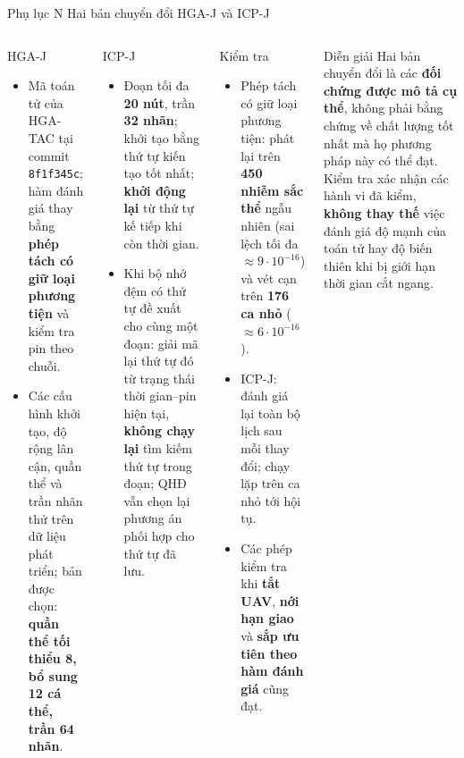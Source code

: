 \documentclass[aspectratio=169,10pt,t,xcolor={table}]{beamer}
\newcommand{\apptitle}[2]{Phụ lục #1 \textperiodcentered{} #2}
\begin{document}
\begin{frame}{\apptitle{N}{Hai bản chuyển đổi HGA-J và ICP-J}}
\begin{columns}[T,onlytextwidth]
\begin{block}{HGA-J}
\scriptsize
\begin{itemize}
\item Mã toán tử của HGA-TAC tại commit \texttt{8f1f345c}; hàm đánh giá thay bằng \textbf{phép tách có giữ loại phương tiện} và kiểm tra pin theo chuỗi.
\item Các cấu hình khởi tạo, độ rộng lân cận, quần thể và trần nhãn thử trên dữ liệu phát triển; bản được chọn: \textbf{quần thể tối thiểu 8, bổ sung 12 cá thể, trần 64 nhãn}.
\end{itemize}
\end{block}
\begin{block}{ICP-J}
\scriptsize
\begin{itemize}
\item Đoạn tối đa \textbf{20 nút}, trần \textbf{32 nhãn}; khởi tạo bằng thứ tự kiến tạo tốt nhất; \textbf{khởi động lại} từ thứ tự kế tiếp khi còn thời gian.
\item Khi bộ nhớ đệm có thứ tự đề xuất cho cùng một đoạn: giải mã lại thứ tự đó từ trạng thái thời gian--pin hiện tại, \textbf{không chạy lại} tìm kiếm thứ tự trong đoạn; QHĐ vẫn chọn lại phương án phối hợp cho thứ tự đã lưu.
\end{itemize}
\end{block}
\begin{block}{Kiểm tra}
\scriptsize
\begin{itemize}
\item Phép tách có giữ loại phương tiện: phát lại trên \textbf{450 nhiễm sắc thể} ngẫu nhiên (sai lệch tối đa $\approx9\cdot10^{-16}$) và vét cạn trên \textbf{176 ca nhỏ} ($\approx6\cdot10^{-16}$).
\item ICP-J: đánh giá lại toàn bộ lịch sau mỗi thay đổi; chạy lặp trên ca nhỏ tới hội tụ.
\item Các phép kiểm tra khi \textbf{tắt UAV}, \textbf{nới hạn giao} và \textbf{sắp ưu tiên theo hàm đánh giá} cũng đạt.
\end{itemize}
\end{block}
\begin{alertblock}{Diễn giải}
\scriptsize Hai bản chuyển đổi là các \textbf{đối chứng được mô tả cụ thể}, không phải bằng chứng về chất lượng tốt nhất mà họ phương pháp này có thể đạt. Kiểm tra xác nhận các hành vi đã kiểm, \textbf{không thay thế} việc đánh giá độ mạnh của toán tử hay độ biến thiên khi bị giới hạn thời gian cắt ngang.
\end{alertblock}
\end{columns}
\end{frame}
\end{document}
